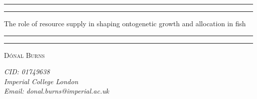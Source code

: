 \begin{titlepage} %
	
	\centering %
	
	\scshape %
	
	
	
	\rule{\textwidth}{1.6pt}\vspace*{-\baselineskip}\vspace*{2pt} %
	\rule{\textwidth}{0.4pt} %
	
	\vspace{0.75\baselineskip} %
	
	{\LARGE The role of resource supply in shaping ontogenetic growth and allocation  in fish\\} %
	
	\vspace{0.75\baselineskip} %
	
	\rule{\textwidth}{0.4pt}\vspace*{-\baselineskip}\vspace{3.2pt} %
	\rule{\textwidth}{1.6pt} %
	
	\vspace{1\baselineskip} %
	
	
	
	
	\vspace{0.5\baselineskip} %
	
	{\scshape\Large D\'onal Burns  \\} %
	
	\vspace{0.5\baselineskip} %
	
	\textit{CID: 01749638 \\ Imperial College London \\ Email: donal.burns@imperial.ac.uk} %
	

\end{titlepage}

